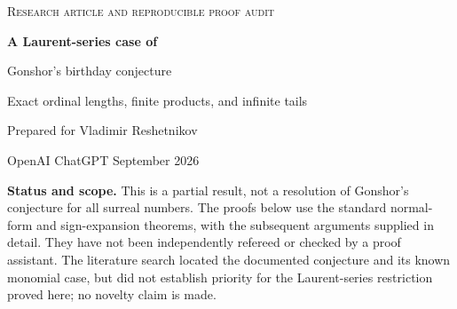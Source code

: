 \documentclass[11pt,letterpaper]{article}
\numberwithin{equation}{section}
\theoremstyle{definition}
\theoremstyle{remark}
\newcommand{\R}{\mathbb{R}}
\begin{document}
\begin{center}
{\small\scshape Research article and reproducible proof audit}\par\vspace{0.8em}
{\LARGE\bfseries\color{Olive} A Laurent-series case of\par
Gonshor's birthday conjecture}\par\vspace{0.7em}
{\large Exact ordinal lengths, finite products, and infinite tails}\par\vspace{0.8em}
Prepared for Vladimir Reshetnikov\par
OpenAI ChatGPT\quad\textbullet{} September 2026
\end{center}
\vspace{0.6em}
\begin{abstract}
Gonshor's conjecture asks whether the birthday of a product of surreal numbers
is bounded by the natural product of their birthdays. We give a detailed proof
of this inequality on the canonically embedded Laurent-series field
$\R((\omega^{-1}))$. The argument first derives an exact birthday formula for
finite Laurent polynomials. The only information required from their bounded
part is the lowest exponent, its coefficient's birthday, and one dyadic versus
nondyadic boundary condition. A positive-polynomial/bounded-tail decomposition
then proves the product estimate for finite Laurent polynomials. A finite-jet
stabilization argument transfers this estimate to arbitrary Laurent series,
without assuming continuity of natural ordinal multiplication. We also prove
the conjecture for finite normal forms with ordinal exponents, determine the
birthday of every infinite Laurent series, and obtain exact birthdays of a
class of reciprocals. An exact-arithmetic program independently checks the
finite formula and explores fractional dyadic exponents beyond the proved
case.
\end{abstract}

\begin{scopebox}
\textbf{Status and scope.} This is a partial result, not a resolution of
Gonshor's conjecture for all surreal numbers. The proofs below use the standard
normal-form and sign-expansion theorems, with the subsequent arguments supplied
in detail. They have not been independently refereed or checked by a proof
assistant. The literature search located the documented conjecture and its
known monomial case, but did not establish priority for the Laurent-series
restriction proved here; no novelty claim is made.
\end{scopebox}
\end{document}
